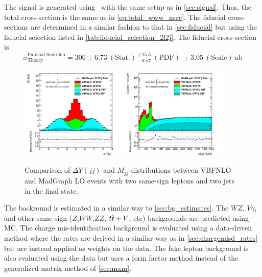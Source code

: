 The signal is generated using \madgraph~with the same setup as in \sec\ref{sec:signal}.
Thus, the total cross-section is the same as in \eqn\eqref{eq:total_www_xsec}.
The fiducial cross-sections are determined in a similar fashion to that in 
\sec\ref{sec:fiducial} but using the fiducial selection listed in \tab\ref{tab:fiducial_selection_2l2j}.
The fiducial cross-section is 
\begin{equation}
\sigma^{\textrm{Fiducial,Semi-lep}}_{\textrm{Theory}}= 306\pm6.73 ~(\textrm{Stat.}) ~^{+15.3}_{-8.57} ~(\textrm{PDF}) ~\pm 3.05 ~(\textrm{Scale}) ~\textrm{ab} %
\end{equation}

\begin{figure}[h]
  \begin{center}
    \includegraphics[width=0.45\textwidth]{figures/combination/dY2j_linear_ratio.pdf}
    \includegraphics[width=0.45\textwidth]{figures/combination/TwojM_log_ratio.pdf}
  \end{center}
  \caption{Comparison of $\Delta Y(jj)$ and $M_{jj}$ distributions between VBFNLO and MadGraph LO events with two same-sign leptons and two jets in the final state. }
  \label{fig:signal_semilep} 
\end{figure}


The backround is estimated in a similar way to \sec\ref{sec:bg_estimates}. The $WZ$, 
$V\gamma$, and other same-sign ($Z$,$WW$,$ZZ$, $t\overline{t}+V$, etc) backgrounds are predicted
using MC. The charge mis-identification background is evaluated using a data-driven method
where the rates are derived in a similar way as in \sec\ref{sec:chargemisd_rates}
but are instead applied as weights on the data.
The fake lepton background is also evaluated using the data but uses a form factor method
instead of the generalized matrix method of \sec\ref{sec:mxm}.


